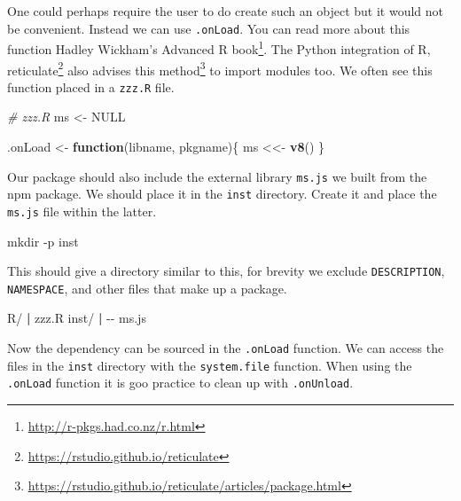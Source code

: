 \documentclass[
]{krantz}
\makeatletter
\newenvironment{Shaded}{\begin{snugshade}}{\end{snugshade}}
\newcommand{\CommentTok}[1]{\textcolor[rgb]{0.37,0.37,0.37}{\textit{#1}}}
\newcommand{\ControlFlowTok}[1]{\textcolor[rgb]{0.27,0.27,0.27}{\textbf{#1}}}
\newcommand{\ExtensionTok}[1]{#1}
\newcommand{\FunctionTok}[1]{\textcolor[rgb]{0,0,0}{#1}}
\newcommand{\KeywordTok}[1]{\textcolor[rgb]{0.27,0.27,0.27}{\textbf{#1}}}
\newcommand{\NormalTok}[1]{#1}
\newcommand{\OtherTok}[1]{\textcolor[rgb]{0.37,0.37,0.37}{#1}}
\newcommand{\StringTok}[1]{\textcolor[rgb]{0.5,0.5,0.5}{#1}}
\renewcommand{\href}[2]{#2\footnote{\url{#1}}}
\newenvironment{kframe}{%
\medskip{}
\setlength{\fboxsep}{.8em}
 \def\at@end@of@kframe{}%
 \ifinner\ifhmode%
  \def\at@end@of@kframe{\end{minipage}}%
  \begin{minipage}{\columnwidth}%
 \fi\fi%
 \def\FrameCommand##1{\hskip\@totalleftmargin \hskip-\fboxsep
 \colorbox{shadecolor}{##1}\hskip-\fboxsep
     \hskip-\linewidth \hskip-\@totalleftmargin \hskip\columnwidth}%
 \MakeFramed {\advance\hsize-\width
   \@totalleftmargin\z@ \linewidth\hsize
   \@setminipage}}%
 {\par\unskip\endMakeFramed%
 \at@end@of@kframe}
\renewenvironment{Shaded}{\begin{kframe}}{\end{kframe}}
\makeatother
\begin{document}
One could perhaps require the user to do create such an object but it would not be convenient. Instead we can use \texttt{.onLoad}. You can read more about this function Hadley Wickham's \href{http://r-pkgs.had.co.nz/r.html}{Advanced R book}. The Python integration of R, \href{https://rstudio.github.io/reticulate}{reticulate} \citep{R-reticulate} also advises \href{https://rstudio.github.io/reticulate/articles/package.html}{this method} to import modules too. We often see this function placed in a \texttt{zzz.R} file.

\begin{Shaded}
\begin{Highlighting}[]
\CommentTok{\# zzz.R}
\NormalTok{ms <{-}}\StringTok{ }\OtherTok{NULL}

\NormalTok{.onLoad <{-}}\StringTok{ }\ControlFlowTok{function}\NormalTok{(libname, pkgname)\{}
\NormalTok{  ms <<{-}}\StringTok{ }\KeywordTok{v8}\NormalTok{()}
\NormalTok{\}}
\end{Highlighting}
\end{Shaded}

Our package should also include the external library \texttt{ms.js} we built from the npm package. We should place it in the \texttt{inst} directory. Create it and place the \texttt{ms.js} file within the latter.

\begin{Shaded}
\begin{Highlighting}[]
\FunctionTok{mkdir}\NormalTok{ {-}p inst}
\end{Highlighting}
\end{Shaded}

This should give a directory similar to this, for brevity we exclude \texttt{DESCRIPTION}, \texttt{NAMESPACE}, and other files that make up a package.

\begin{Shaded}
\begin{Highlighting}[]
\ExtensionTok{R/}
\KeywordTok{|} \ExtensionTok{zzz.R}
\ExtensionTok{inst/}
\KeywordTok{|} \ExtensionTok{{-}{-}}\NormalTok{ ms.js}
\end{Highlighting}
\end{Shaded}

Now the dependency can be sourced in the \texttt{.onLoad} function. We can access the files in the \texttt{inst} directory with the \texttt{system.file} function. When using the \texttt{.onLoad} function it is goo practice to clean up with \texttt{.onUnload}.
\end{document}

